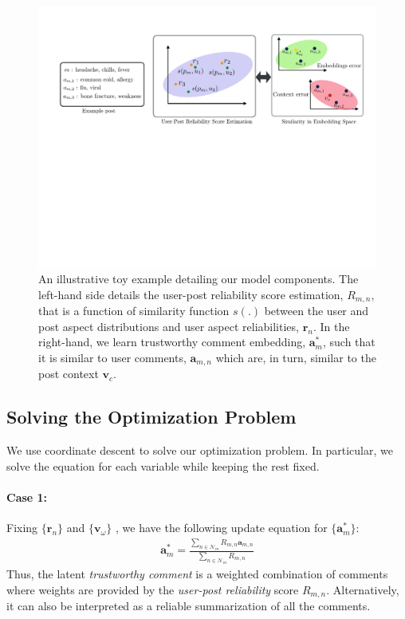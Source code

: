 \begin{figure}[tb]
\centering
\includegraphics[scale=0.6]{images/architecture_gray_post_combined.pdf}
\caption{\small An illustrative toy example detailing our model components.
The left-hand side details the user-post reliability score estimation, $R_{m,n}$, that is a function of similarity function $s(.)$ between the user and post aspect distributions and user aspect reliabilities, $\bm{r}_n$. In the right-hand, we learn trustworthy comment embedding, $\bm{a}_m^{*}$, such that it is similar to user comments, $\bm{a}_{m,n}$ which are, in turn, similar to the post context $\bm{v}_c$.
}
\label{fig:model}
\end{figure}

\subsection{Solving the Optimization Problem}
We use coordinate descent \cite{bertsekas1999nonlinear} to solve our optimization problem. In particular, we solve the equation for each variable while keeping the rest fixed.

\paragraph{Case 1:}
Fixing $\{\bm{r}_n\}$ and $\{ \bm{v}_{\omega} \}$
, we have the following update equation for $ \{ \bm{a}_m^* \}$:
 {\small
\begin{align}
\bm{a}_m^* = \frac{ \sum_{n \in \mathcal{N}_m} R_{m,n} \bm{a}_{m,n} } { \sum_{n \in \mathcal{N}_m} R_{m,n} }
\end{align}
}
Thus, the latent \emph{trustworthy comment} is a weighted combination of comments where weights are provided by the \emph{user-post reliability} score $R_{m,n}$.
Alternatively, it can also be interpreted as a reliable summarization of all the comments.
